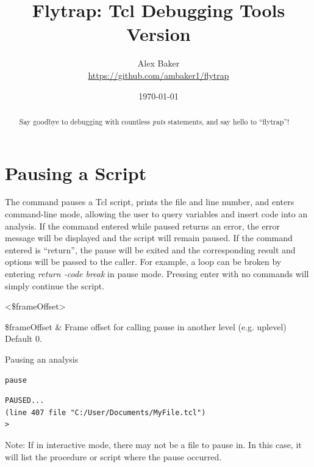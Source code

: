 \documentclass{article}
\title{\Huge Flytrap: Tcl Debugging Tools\\\small Version \version}
\author{Alex Baker\\\small\url{https://github.com/ambaker1/flytrap}}
\date{\small\today}
\renewcommand{\^}[1]{\textsuperscript{#1}}
\renewcommand{\_}[1]{\textsubscript{#1}}
\begin{document}
\maketitle
\begin{abstract}
\begin{center}
Say goodbye to debugging with countless \textit{puts} statements, and say hello to ``flytrap''!
\end{center}
\end{abstract}
\clearpage
\section{Pausing a Script} 
The  command pauses a Tcl script, prints the file and line number, and enters command-line mode, allowing the user to query variables and insert code into an analysis. 
If the command entered while paused returns an error, the error message will be displayed and the script will remain paused. 
If the command entered is ``return'', the pause will be exited and the corresponding result and options will be passed to the caller. 
For example, a loop can be broken by entering \textit{return -code break} in pause mode. 
Pressing enter with no commands will simply continue the script.
\begin{syntax}
 <\$frameOffset>
\end{syntax}
\begin{args}
\$frameOffset & Frame offset for calling pause in another level (e.g. uplevel) Default 0. 
\end{args}
\begin{example}{Pausing an analysis}
\begin{lstlisting}
pause
\end{lstlisting}
\tcblower
\begin{lstlisting}
PAUSED...
(line 407 file "C:/User/Documents/MyFile.tcl")
> 
\end{lstlisting}
\end{example}
Note: If in interactive mode, there may not be a file to pause in. 
In this case, it will list the procedure or script where the pause occurred.
\clearpage
\end{document}
